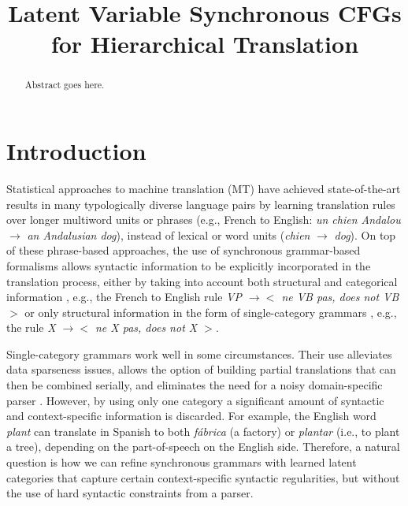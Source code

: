 \documentclass[11pt]{article}
\title{Latent Variable Synchronous CFGs for Hierarchical Translation}
\date{}
\begin{document}
\maketitle
\begin{abstract}
  Abstract goes here.  
\end{abstract}

\section{Introduction}
Statistical approaches to machine translation (MT) have achieved state-of-the-art results in many typologically diverse language pairs \cite{Bojar2013} by learning translation rules over longer multiword units or phrases (e.g., French to English: \emph{un chien Andalou} $\rightarrow$ \emph{an Andalusian dog}), instead of lexical or word units (\emph{chien} $\rightarrow$ \emph{dog}).  
On top of these phrase-based approaches, the use of synchronous grammar-based formalisms \cite{Lewis1968} allows syntactic information to be explicitly incorporated in the translation process, either by taking into account both structural and categorical information \cite{Galley2004}, e.g., the French to English rule \emph{VP $\rightarrow <$ ne VB pas, does not VB $>$} or only structural information in the form of single-category grammars \cite{Chiang2005}, e.g., the rule \emph{X $\rightarrow <$ ne X pas, does not X $>$}.  

Single-category grammars work well in some circumstances.
Their use alleviates data sparseness issues, allows the option of building partial translations that can then be combined serially, and eliminates the need for a noisy domain-specific parser \cite{Zollmann2006}.  
However, by using only one category a significant amount of syntactic and context-specific information is discarded. 
For example, the English word \emph{plant} can translate in Spanish to both \emph{f{\'a}brica} (a factory) or \emph{plantar} (i.e., to plant a tree), depending on the part-of-speech on the English side.  
Therefore, a natural question is how we can refine synchronous grammars with learned latent categories that capture certain context-specific syntactic regularities, but without the use of hard syntactic constraints from a parser.  
\end{document}

